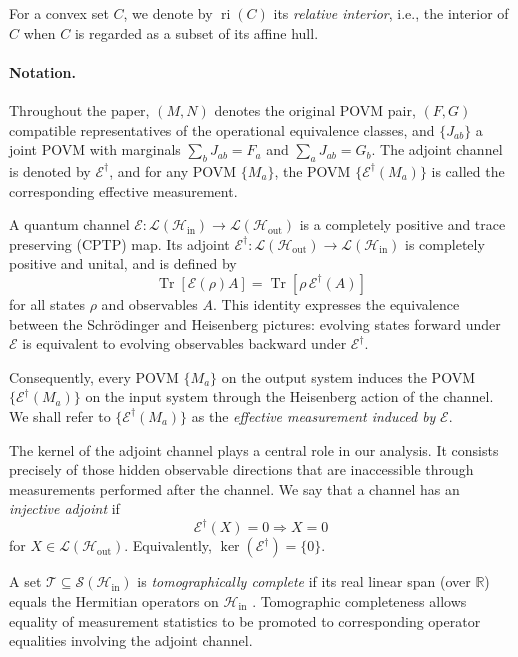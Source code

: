 \documentclass[
aps,pra,twocolumn,10pt,
superscriptaddress,longbibliography,floatfix
]{revtex4-2}
\DeclareMathOperator{\Tr}{Tr}
\begin{document}
For a convex set $C$, we denote by $\operatorname{ri}(C)$ its \emph{relative interior}, i.e., the interior of $C$ when $C$ is regarded as a subset of its affine hull.

\paragraph*{Notation.}
Throughout the paper, $(M,N)$ denotes the original POVM pair, $(F,G)$ compatible representatives of the operational equivalence classes, and $\{J_{ab}\}$ a joint POVM with marginals $\sum_bJ_{ab}=F_a$ and $\sum_aJ_{ab}=G_b$. The adjoint channel is denoted by $\mathcal E^\dagger$, and for any POVM $\{M_a\}$, the POVM $\{\mathcal E^\dagger(M_a)\}$ is called the corresponding effective measurement.

A quantum channel $\mathcal{E}: \mathcal{L}(\mathcal{H}_{\mathrm{in}}) \to \mathcal{L}(\mathcal{H}_{\mathrm{out}})$ is a completely positive and trace preserving (CPTP) map. Its adjoint $\mathcal{E}^\dagger: \mathcal{L}(\mathcal{H}_{\mathrm{out}}) \to \mathcal{L}(\mathcal{H}_{\mathrm{in}})$ is completely positive and unital, and is defined by
\[
\Tr[\mathcal{E}(\rho) A] = \Tr[\rho \,\mathcal{E}^\dagger(A)]
\]
for all states $\rho$ and observables $A$. This identity expresses the equivalence between the Schr\"odinger and Heisenberg pictures: evolving states forward under $\mathcal E$ is equivalent to evolving observables backward under $\mathcal E^\dagger$.

Consequently, every POVM $\{M_a\}$ on the output system induces the POVM $\{\mathcal{E}^\dagger(M_a)\}$ on the input system through the Heisenberg action of the channel. We shall refer to $\{\mathcal E^\dagger(M_a)\}$ as the \emph{effective measurement induced by} $\mathcal E$.

The kernel of the adjoint channel plays a central role in our analysis. It consists precisely of those hidden observable directions that are inaccessible through measurements performed after the channel. We say that a channel has an \emph{injective adjoint} if
\[
\mathcal{E}^\dagger(X) = 0 \Rightarrow X = 0
\]
for $X \in \mathcal{L}(\mathcal{H}_{\mathrm{out}})$. Equivalently, $\ker(\mathcal{E}^\dagger) = \{0\}$.

A set $\mathcal{T} \subseteq \mathcal{S}(\mathcal{H}_{\mathrm{in}})$ is \emph{tomographically complete} if its real linear span (over $\mathbb{R}$) equals the Hermitian operators on $\mathcal{H}_{\mathrm{in}}$ \cite{ParisRehacek2004}. Tomographic completeness allows equality of measurement statistics to be promoted to corresponding operator equalities involving the adjoint channel.
\end{document}
